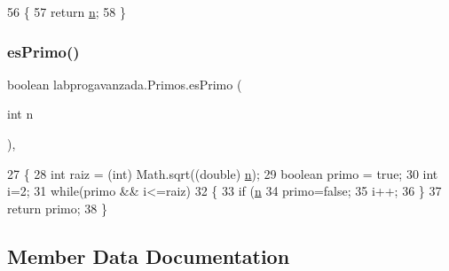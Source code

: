 \begin{DoxyCode}
56                         \{
57         \textcolor{keywordflow}{return} \mbox{\hyperlink{classlabprogavanzada_1_1_primos_a07e981f7bb9b39f7ead20be760e628fb}{n}};
58     \}
\end{DoxyCode}
\mbox{\label{classlabprogavanzada_1_1_primos_a7eeebcb76da9a4ad43a1889bdee5bb07}} 
\subsubsection{\texorpdfstring{es\+Primo()}{esPrimo()}}
{\footnotesize\ttfamily boolean labprogavanzada.\+Primos.\+es\+Primo (\begin{DoxyParamCaption}\item[{int}]{n }\end{DoxyParamCaption})\hspace{0.3cm}{\ttfamily [inline]}, {\ttfamily [private]}}


\begin{DoxyCode}
27                                   \{
28         \textcolor{keywordtype}{int} raiz = (int) Math.sqrt((\textcolor{keywordtype}{double}) \mbox{\hyperlink{classlabprogavanzada_1_1_primos_a07e981f7bb9b39f7ead20be760e628fb}{n}});
29         \textcolor{keywordtype}{boolean} primo = \textcolor{keyword}{true};
30         \textcolor{keywordtype}{int} i=2;
31         \textcolor{keywordflow}{while}(primo && i<=raiz)
32         \{
33             \textcolor{keywordflow}{if} (\mbox{\hyperlink{classlabprogavanzada_1_1_primos_a07e981f7bb9b39f7ead20be760e628fb}{n}} %
34                 primo=\textcolor{keyword}{false};
35             i++;
36         \}
37         \textcolor{keywordflow}{return} primo;
38     \}
\end{DoxyCode}


\subsection{Member Data Documentation}
\mbox{\label{classlabprogavanzada_1_1_primos_a07e981f7bb9b39f7ead20be760e628fb}} 
